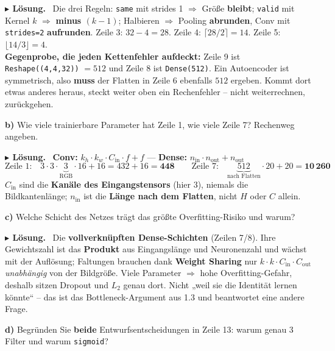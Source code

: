 \documentclass[10pt,a4paper]{article}
\newenvironment{loes}%
  {\par\vspace{2pt}\begingroup\small\noindent\textbf{\color{loesfarbe}$\blacktriangleright$ Lösung.}\ }%
  {\endgroup\par\vspace{5pt}}
\begin{document}
\begin{loes}
Die drei Regeln: \texttt{same} mit strides 1 $\Rightarrow$ Größe \textbf{bleibt};
\texttt{valid} mit Kernel $k$ $\Rightarrow$ \textbf{minus $(k-1)$}; Halbieren $\Rightarrow$
Pooling \textbf{abrunden}, Conv mit \texttt{strides=2} \textbf{aufrunden}.
Zeile 3: $32-4 = 28$. Zeile 4: $\lceil 28/2\rceil = 14$. Zeile 5: $\lfloor 14/3 \rfloor = 4$.\\[2pt]
\textbf{Gegenprobe, die jeden Kettenfehler aufdeckt:} Zeile 9 ist
\texttt{Reshape((4,4,32))} $= 512$ und Zeile 8 ist \texttt{Dense(512)}. Ein Autoencoder ist
symmetrisch, also \textbf{muss} der Flatten in Zeile 6 ebenfalls $512$ ergeben. Kommt dort etwas
anderes heraus, steckt weiter oben ein Rechenfehler -- nicht weiterrechnen, zurückgehen.
\end{loes}

\textbf{b)} Wie viele trainierbare Parameter hat Zeile 1, wie viele Zeile 7? Rechenweg angeben.

\begin{loes}
\textbf{Conv:} $k_h \cdot k_w \cdot C_{\text{in}} \cdot f + f$ \quad --- \quad
\textbf{Dense:} $n_{\text{in}} \cdot n_{\text{out}} + n_{\text{out}}$
\[
\text{Zeile 1:}\quad 3\cdot3\cdot\underbrace{3}_{\text{RGB}}\cdot16 + 16 = 432+16 = \mathbf{448}
\qquad
\text{Zeile 7:}\quad \underbrace{512}_{\text{nach Flatten}}\cdot20 + 20 = \mathbf{10\,260}
\]
$C_{\text{in}}$ sind die \textbf{Kanäle des Eingangstensors} (hier 3), niemals die Bildkantenlänge;
$n_{\text{in}}$ ist die \textbf{Länge nach dem Flatten}, nicht $H$ oder $C$ allein.
\end{loes}

\textbf{c)} Welche Schicht des Netzes trägt das größte Overfitting-Risiko und warum?

\begin{loes}
Die \textbf{vollverknüpften Dense-Schichten} (Zeilen 7/8). Ihre Gewichtszahl ist das
\textbf{Produkt} aus Eingangslänge und Neuronenzahl und wächst mit der Auflösung; Faltungen
brauchen dank \textbf{Weight Sharing} nur $k\cdot k\cdot C_{\text{in}}\cdot C_{\text{out}}$
\emph{unabhängig} von der Bildgröße. Viele Parameter $\Rightarrow$ hohe Overfitting-Gefahr,
deshalb sitzen Dropout und $L_2$ genau dort.
Nicht „weil sie die Identität lernen könnte`` -- das ist das Bottleneck-Argument aus 1.3 und
beantwortet eine andere Frage.
\end{loes}

\textbf{d)} Begründen Sie \textbf{beide} Entwurfsentscheidungen in Zeile 13: warum genau 3 Filter
und warum \texttt{sigmoid}?
\end{document}
